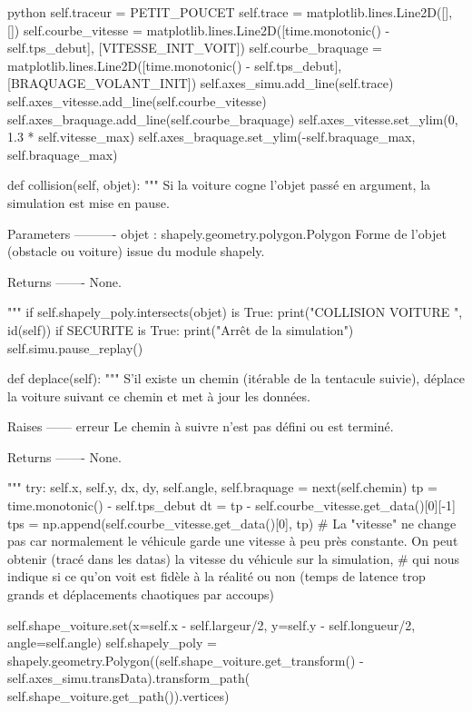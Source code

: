 \begin{mintedbox}{python}
        self.traceur = PETIT_POUCET
        self.trace = matplotlib.lines.Line2D([], [])
        self.courbe_vitesse = matplotlib.lines.Line2D([time.monotonic() - self.tps_debut], [VITESSE_INIT_VOIT])
        self.courbe_braquage = matplotlib.lines.Line2D([time.monotonic() - self.tps_debut], [BRAQUAGE_VOLANT_INIT])
        self.axes_simu.add_line(self.trace)
        self.axes_vitesse.add_line(self.courbe_vitesse)
        self.axes_braquage.add_line(self.courbe_braquage)
        self.axes_vitesse.set_ylim(0, 1.3 * self.vitesse_max)
        self.axes_braquage.set_ylim(-self.braquage_max, self.braquage_max)

    def collision(self, objet):
        """
        Si la voiture cogne l'objet passé en argument, la simulation est mise en pause.

        Parameters
        ----------
        objet : shapely.geometry.polygon.Polygon
            Forme de l'objet (obstacle ou voiture) issue du module shapely.

        Returns
        -------
        None.

        """
        if self.shapely_poly.intersects(objet) is True:
            print("COLLISION VOITURE ", id(self))
            if SECURITE is True:
                print("Arrêt de la simulation")
                self.simu.pause_replay()

    def deplace(self):
        """
        S'il existe un chemin (itérable de la tentacule suivie), déplace la voiture suivant ce chemin et met à jour les données.

        Raises
        ------
        erreur
            Le chemin à suivre n'est pas défini ou est terminé.

        Returns
        -------
        None.

        """
        try:
            self.x, self.y, dx, dy, self.angle, self.braquage = next(self.chemin)
            tp = time.monotonic() - self.tps_debut
            dt = tp - self.courbe_vitesse.get_data()[0][-1]
            tps = np.append(self.courbe_vitesse.get_data()[0], tp)
            # La "vitesse" ne change pas car normalement le véhicule garde une vitesse à peu près constante. On peut obtenir (tracé dans les datas) la vitesse du véhicule sur la simulation,
            # qui nous indique si ce qu'on voit est fidèle à la réalité ou non (temps de latence trop grands et déplacements chaotiques par accoups)

            self.shape_voiture.set(x=self.x - self.largeur/2, y=self.y - self.longueur/2, angle=self.angle)
            self.shapely_poly = shapely.geometry.Polygon((self.shape_voiture.get_transform() - self.axes_simu.transData).transform_path( self.shape_voiture.get_path()).vertices)


\end{mintedbox}
